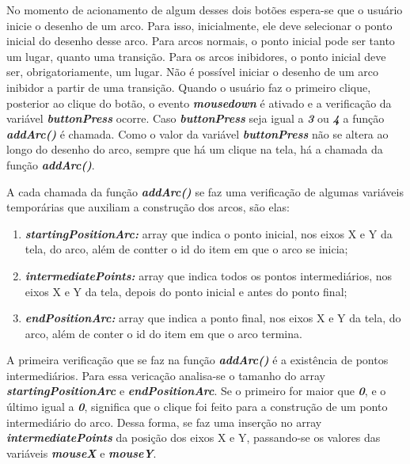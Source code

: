 \documentclass[
	12pt,				%
	openright,			%
	oneside,			%
	a4paper,			%
	english,			%
	brazil				%
	]{abntex2}
\theoremstyle{doispontos}
\begin{document}
No momento de acionamento de algum desses dois botões espera-se que o usuário inicie o desenho de um arco. Para isso, inicialmente, ele deve selecionar o ponto inicial do desenho desse arco. Para arcos normais, o ponto inicial pode ser tanto um lugar, quanto uma transição. Para os arcos inibidores, o ponto inicial deve ser, obrigatoriamente, um lugar. Não é possível iniciar o desenho de um arco inibidor a partir de uma transição. Quando o usuário faz o primeiro clique, posterior ao clique do botão, o evento \textbf{\textit{mousedown}} é ativado e a verificação da variável \textbf{\textit{buttonPress}} ocorre. Caso \textbf{\textit{buttonPress}} seja igual a \textbf{\textit{3}} ou \textbf{\textit{4}} a função \textbf{\textit{addArc()}} é chamada. Como o valor da variável \textbf{\textit{buttonPress}} não se altera ao longo do desenho do arco, sempre que há um clique na tela, há a chamada da função \textbf{\textit{addArc()}}.

A cada chamada da função \textbf{\textit{addArc()}} se faz uma verificação de algumas variáveis temporárias que auxiliam a construção dos arcos, são elas: 

\begin{enumerate}
	\item \textbf{\textit{startingPositionArc:}} array que indica o ponto inicial, nos eixos X e Y da tela, do arco, além de contter o id do item em que o arco se inicia;
	\item \textbf{\textit{intermediatePoints:}} array que indica todos os pontos intermediários, nos eixos X e Y da tela, depois do ponto inicial e antes do ponto final;
	\item \textbf{\textit{endPositionArc:}} array que indica a ponto final, nos eixos X e Y da tela, do arco, além de conter o id do item em que o arco termina.
\end{enumerate}

A primeira verificação que se faz na função \textbf{\textit{addArc()}} é a existência de pontos intermediários. Para essa vericação analisa-se o tamanho do array \textbf{\textit{startingPositionArc}} e \textbf{\textit{endPositionArc}}. Se o primeiro for maior que \textbf{\textit{0}}, e o último igual a \textit{\textbf{0}}, significa que o clique foi feito para a construção de um ponto intermediário do arco. Dessa forma, se faz uma inserção no array \textbf{\textit{intermediatePoints}} da posição dos eixos X e Y, passando-se os valores das variáveis \textbf{\textit{mouseX}} e \textbf{\textit{mouseY}}.


\end{document}
